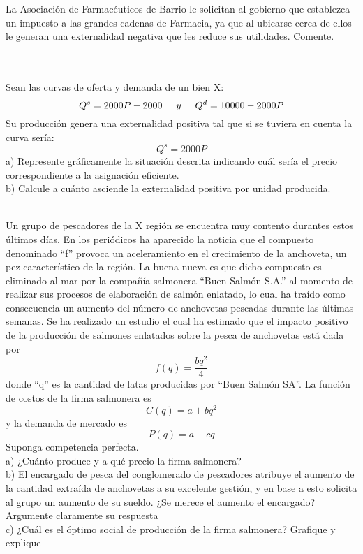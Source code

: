 \documentclass[addpoints,answers]{exam}
\begin{document}
\begin{questions}

\question La Asociación de Farmacéuticos de Barrio le solicitan al gobierno que establezca un impuesto
a las grandes cadenas de Farmacia, ya que al ubicarse cerca de ellos le generan una externalidad
negativa que les reduce sus utilidades. Comente.


\\
\\
\question Sean las curvas de oferta y demanda de un bien X:
\[Q^{s} = 2000P - 2000 \hspace{0.5cm}  y \hspace{0.5cm} Q^{d} = 10000 - 2000P\] \hfill \break
Su producción genera una externalidad positiva tal que si se tuviera en cuenta la curva sería: 
\hspace{0.5cm} \[Q^{s} = 2000P\] \hfill \break
a) Represente gráficamente la situación descrita indicando cuál sería el precio
correspondiente a la asignación eficiente.
\\
b) Calcule a cuánto asciende la externalidad positiva por unidad producida.

\\

\question Un grupo de pescadores de la X región se encuentra muy contento durantes estos
últimos días. En los periódicos ha aparecido la noticia que el compuesto denominado
“f” provoca un aceleramiento en el crecimiento de la anchoveta, un pez característico
de la región. La buena nueva es que dicho compuesto es eliminado al mar por la
compañía salmonera “Buen Salmón S.A.” al momento de realizar sus procesos de
elaboración de salmón enlatado, lo cual ha traído como consecuencia un aumento del
número de anchovetas pescadas durante las últimas semanas. Se ha realizado un
estudio el cual ha estimado que el impacto positivo de la producción de salmones
enlatados sobre la pesca de anchovetas está dada por
 \[f(q) = \frac{bq^2}{4}\] donde “q” es la
cantidad de latas producidas por “Buen Salmón SA”. La función de costos de la firma
salmonera es \[C(q) = a + bq^2\] y la demanda de mercado es \[P(q) = a - cq\] Suponga competencia perfecta.
\\

a) ¿Cuánto produce y a qué precio la firma salmonera?
\\
b) El encargado de pesca del conglomerado de pescadores atribuye el aumento de la
cantidad extraída de anchovetas a su excelente gestión, y en base a esto solicita al
grupo un aumento de su sueldo. ¿Se merece el aumento el encargado? Argumente
claramente su respuesta
\\
c) ¿Cuál es el óptimo social de producción de la firma salmonera? Grafique y explique





\end{questions}
\end{document}
